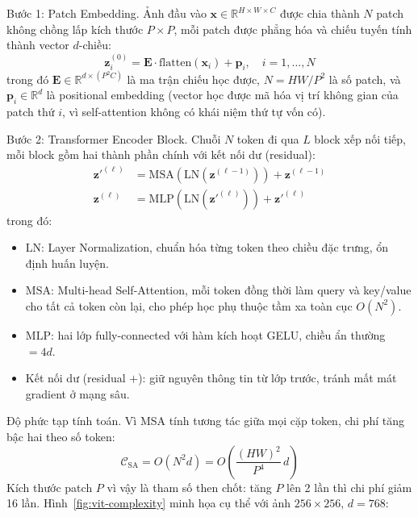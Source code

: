 Bước 1: Patch Embedding.
Ảnh đầu vào $\mathbf{x} \in \mathbb{R}^{H \times W \times C}$ được chia thành $N$ patch không chồng lấp kích thước $P \times P$, mỗi patch được phẳng hóa và chiếu tuyến tính thành vector $d$-chiều:
\begin{equation}
\mathbf{z}_i^{(0)} = \mathbf{E} \cdot \mathrm{flatten}(\mathbf{x}_i) + \mathbf{p}_i, \quad i = 1, \ldots, N
\label{eq:patch-embed}
\end{equation}
trong đó $\mathbf{E} \in \mathbb{R}^{d \times (P^2 C)}$ là ma trận chiếu học được, $N = HW/P^2$ là số patch, và $\mathbf{p}_i \in \mathbb{R}^d$ là positional embedding (vector học được mã hóa vị trí không gian của patch thứ $i$, vì self-attention không có khái niệm thứ tự vốn có).

Bước 2: Transformer Encoder Block.
Chuỗi $N$ token đi qua $L$ block xếp nối tiếp, mỗi block gồm hai thành phần chính với kết nối dư (residual):
\begin{align}
\mathbf{z}'^{(\ell)} &= \mathrm{MSA}\!\left(\mathrm{LN}(\mathbf{z}^{(\ell-1)})\right) + \mathbf{z}^{(\ell-1)} \label{eq:vit-msa} \\
\mathbf{z}^{(\ell)}  &= \mathrm{MLP}\!\left(\mathrm{LN}(\mathbf{z}'^{(\ell)})\right) + \mathbf{z}'^{(\ell)} \label{eq:vit-mlp}
\end{align}
trong đó:
\begin{itemize}\itemsep1pt
    \item $\mathrm{LN}$: Layer Normalization, chuẩn hóa từng token theo chiều đặc trưng, ổn định huấn luyện.
    \item $\mathrm{MSA}$: Multi-head Self-Attention, mỗi token đồng thời làm query và key/value cho tất cả token còn lại, cho phép học phụ thuộc tầm xa toàn cục $O(N^2)$.
    \item $\mathrm{MLP}$: hai lớp fully-connected với hàm kích hoạt GELU, chiều ẩn thường $= 4d$.
    \item Kết nối dư (residual $+$): giữ nguyên thông tin từ lớp trước, tránh mất mát gradient ở mạng sâu.
\end{itemize}

Độ phức tạp tính toán.
Vì MSA tính tương tác giữa mọi cặp token, chi phí tăng bậc hai theo số token:
\begin{equation}
\mathcal{C}_{\mathrm{SA}} = O(N^2 d) = O\!\left(\frac{(HW)^2}{P^4}\,d\right)
\label{eq:vit-complexity}
\end{equation}
Kích thước patch $P$ vì vậy là tham số then chốt: tăng $P$ lên 2 lần thì chi phí giảm 16 lần. Hình~\ref{fig:vit-complexity} minh họa cụ thể với ảnh $256\times256$, $d=768$:

